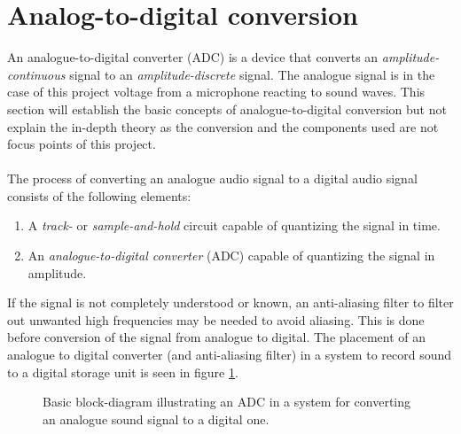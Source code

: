 \section{Analog-to-digital conversion} \label{ADC}
An analogue-to-digital converter (ADC) is a device that converts an \textit{amplitude-continuous} signal to an \textit{amplitude-discrete} signal.  The analogue signal is in the case of this project voltage from a microphone reacting to sound waves. This section will establish the basic concepts of analogue-to-digital conversion but not explain the in-depth theory as the conversion and the components used are not focus points of this project.
\\ \\
The process of converting an analogue audio signal to a digital audio signal consists of the following elements:
\begin{enumerate}
\item A \textit{track-} or \textit{sample-and-hold} circuit capable of quantizing the signal in time.
\item An \textit{analogue-to-digital converter} (ADC) capable of quantizing the signal in amplitude.
\end{enumerate}
If the signal is not completely understood or known, an anti-aliasing filter to filter out unwanted high frequencies may be needed to avoid aliasing. This is done before conversion of the signal from analogue to digital. The placement of an analogue to digital converter (and anti-aliasing filter) in a system to record sound to a digital storage unit is seen in figure \ref{fig:input}.
\begin{figure}[H]
\centering
{}
\caption{Basic block-diagram illustrating an ADC in a system for converting an analogue sound signal to a digital one.} 
\label{fig:input}
\end{figure}
%

